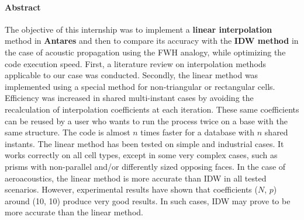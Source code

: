 \paragraph{Abstract}
\vspace{0,5cm}
The objective of this internship was to implement a \textbf{linear interpolation} method in \textbf{Antares} and then to compare its accuracy with the \textbf{IDW method} in the case of acoustic propagation using the FWH analogy, while optimizing the code execution speed.
First, a literature review on interpolation methods applicable to our case was conducted.
Secondly, the linear method was implemented using a special method for non-triangular or rectangular cells.
Efficiency was increased in shared multi-instant cases by avoiding the recalculation of interpolation coefficients at each iteration.
These same coefficients can be reused by a user who wants to run the process twice on a base with the same structure.
The code is almost \(n\) times faster for a database with \(n\) shared instants.
The linear method has been tested on simple and industrial cases.
It works correctly on all cell types, except in some very complex cases, such as prisms with non-parallel and/or differently sized opposing faces.
In the case of aeroacoustics, the linear method is more accurate than IDW in all tested scenarios. However, experimental results have shown that coefficients (\(N\), \(p\)) around (10, 10) produce very good results. In such cases, IDW may prove to be more accurate than the linear method.




